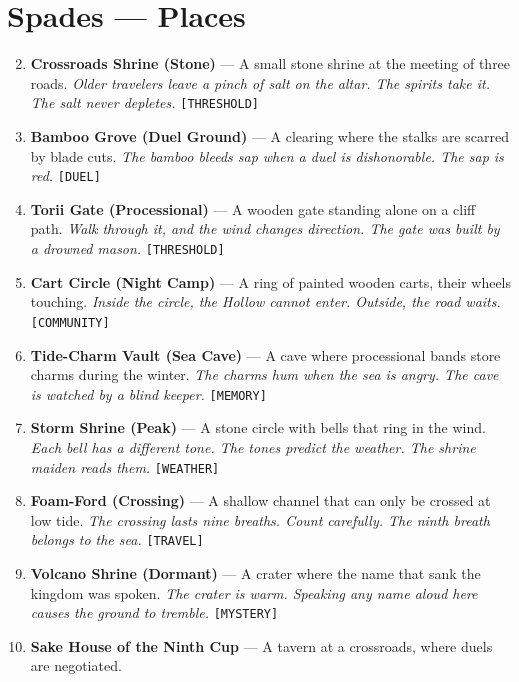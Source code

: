 \section*{Spades --- Places}
\label{sec:lethai-al-places}
\begin{enumerate}
\setcounter{enumi}{1}
\item {} \textbf{Crossroads Shrine (Stone)} --- A small stone shrine at the meeting of three roads.
  \hfill \textit{Older travelers leave a pinch of salt on the altar. The spirits take it. The salt never depletes.} \texttt{[THRESHOLD]}
\item {} \textbf{Bamboo Grove (Duel Ground)} --- A clearing where the stalks are scarred by blade cuts.
  \hfill \textit{The bamboo bleeds sap when a duel is dishonorable. The sap is red.} \texttt{[DUEL]}
\item {} \textbf{Torii Gate (Processional)} --- A wooden gate standing alone on a cliff path.
  \hfill \textit{Walk through it, and the wind changes direction. The gate was built by a drowned mason.} \texttt{[THRESHOLD]}
\item {} \textbf{Cart Circle (Night Camp)} --- A ring of painted wooden carts, their wheels touching.
  \hfill \textit{Inside the circle, the Hollow cannot enter. Outside, the road waits.} \texttt{[COMMUNITY]}
\item {} \textbf{Tide-Charm Vault (Sea Cave)} --- A cave where processional bands store charms during the winter.
  \hfill \textit{The charms hum when the sea is angry. The cave is watched by a blind keeper.} \texttt{[MEMORY]}
\item {} \textbf{Storm Shrine (Peak)} --- A stone circle with bells that ring in the wind.
  \hfill \textit{Each bell has a different tone. The tones predict the weather. The shrine maiden reads them.} \texttt{[WEATHER]}
\item {} \textbf{Foam-Ford (Crossing)} --- A shallow channel that can only be crossed at low tide.
  \hfill \textit{The crossing lasts nine breaths. Count carefully. The ninth breath belongs to the sea.} \texttt{[TRAVEL]}
\item {} \textbf{Volcano Shrine (Dormant)} --- A crater where the name that sank the kingdom was spoken.
  \hfill \textit{The crater is warm. Speaking any name aloud here causes the ground to tremble.} \texttt{[MYSTERY]}
\item {} \textbf{Sake House of the Ninth Cup} --- A tavern at a crossroads, where duels are negotiated.

\end{enumerate}
